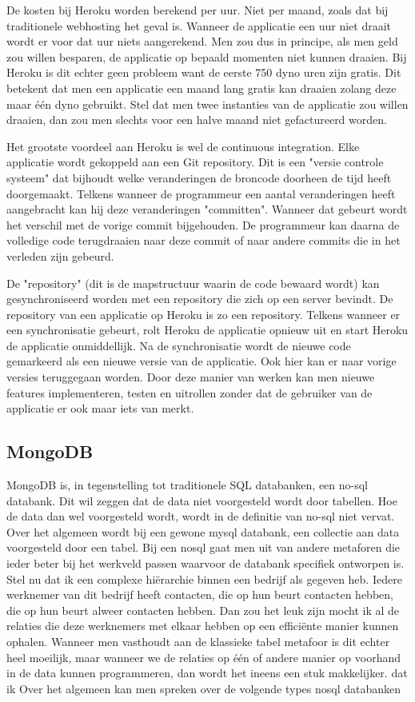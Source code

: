 \documentclass[a4paper,11pt]{article}
\begin{document}
De kosten bij Heroku worden berekend per uur. Niet per maand, zoals dat bij traditionele webhosting het geval is. Wanneer de applicatie een uur niet draait wordt er voor dat uur niets aangerekend. Men zou dus in principe, als men geld zou willen besparen, de applicatie op bepaald momenten niet kunnen draaien. Bij Heroku is dit echter geen probleem want de eerste 750 dyno uren zijn gratis. Dit betekent dat men een  applicatie een maand lang gratis kan draaien zolang deze maar één dyno gebruikt. Stel dat men twee instanties van de applicatie zou willen draaien, dan zou men slechts voor een halve maand niet gefactureerd worden.

Het grootste voordeel aan Heroku is wel de continuous integration. Elke applicatie wordt gekoppeld aan een Git repository. Dit is een "versie controle systeem" dat bijhoudt welke veranderingen de broncode doorheen de tijd heeft doorgemaakt. Telkens wanneer de programmeur een aantal veranderingen heeft aangebracht kan hij deze veranderingen "committen". Wanneer dat gebeurt wordt het verschil met de vorige commit bijgehouden. De programmeur kan daarna de volledige code terugdraaien naar deze commit of naar andere commits die in het verleden zijn gebeurd.

De "repository" (dit is de mapstructuur waarin de code bewaard wordt) kan gesynchroniseerd worden met een repository die zich op een server bevindt. De repository van een applicatie op Heroku is zo een repository. Telkens wanneer er een synchronisatie gebeurt, rolt Heroku de applicatie opnieuw uit en start Heroku de applicatie onmiddellijk. Na de synchronisatie wordt de nieuwe code gemarkeerd als een nieuwe versie van de applicatie. Ook hier kan er naar vorige versies teruggegaan worden. Door deze manier van werken kan men nieuwe features implementeren, testen en uitrollen zonder dat de gebruiker van de applicatie er ook maar iets van merkt.

\subsection{MongoDB}
MongoDB \cite{mongodb:site} is, in tegenstelling tot traditionele SQL databanken, een 
no-sql databank. Dit wil zeggen dat de data niet voorgesteld wordt door 
tabellen. Hoe de data dan wel voorgesteld wordt, wordt in de definitie 
van no-sql niet vervat. Over het algemeen wordt bij een gewone mysql 
databank, een collectie aan data voorgesteld door een tabel. Bij een 
nosql gaat men uit van andere metaforen die ieder beter bij het 
werkveld passen waarvoor de databank specifiek ontworpen is. Stel nu 
dat ik een complexe hiërarchie binnen een bedrijf als gegeven heb. 
Iedere werknemer van dit bedrijf heeft contacten, die op hun beurt 
contacten hebben, die op hun beurt alweer contacten hebben. Dan zou 
het leuk zijn mocht ik al de relaties die deze werknemers met elkaar 
hebben op een efficiënte manier kunnen ophalen. Wanneer men vasthoudt 
aan de klassieke tabel metafoor is dit echter heel moeilijk, maar 
wanneer we de relaties op één of andere manier op voorhand in de data 
kunnen programmeren, dan wordt het ineens een stuk makkelijker.
dat ik  Over het algemeen kan men spreken over de 
volgende types nosql databanken
\end{document}

